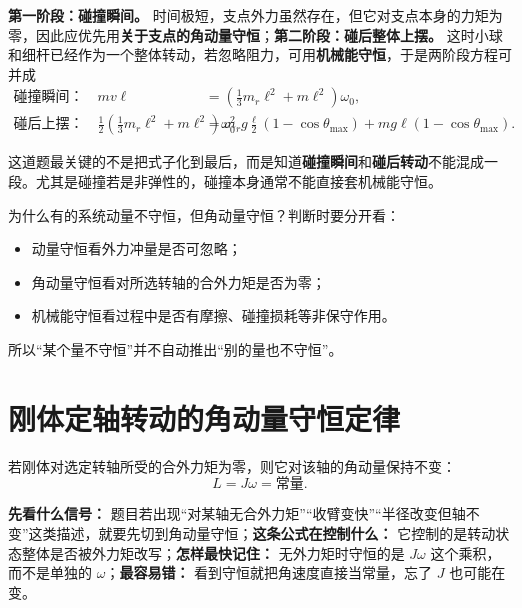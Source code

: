 \documentclass[lang=cn,11pt]{elegantbook}
\begin{document}
\begin{solution}
\textbf{第一阶段：碰撞瞬间。} 时间极短，支点外力虽然存在，但它对支点本身的力矩为零，因此应优先用\textbf{关于支点的角动量守恒}；\textbf{第二阶段：碰后整体上摆。} 这时小球和细杆已经作为一个整体转动，若忽略阻力，可用\textbf{机械能守恒}，于是两阶段方程可并成
\[
\begin{aligned}
\text{碰撞瞬间：}\quad
mv\ell&=\left(\frac13 m_r\ell^2+m\ell^2\right)\omega_0,\\
\text{碰后上摆：}\quad
\frac12 \left(\frac13 m_r\ell^2+m\ell^2\right)\omega_0^2
&=m_rg\frac{\ell}{2}(1-\cos\theta_{\max})+mg\ell(1-\cos\theta_{\max}).
\end{aligned}
\]

这道题最关键的不是把式子化到最后，而是知道\textbf{碰撞瞬间}和\textbf{碰后转动}不能混成一段。尤其是碰撞若是非弹性的，碰撞本身通常不能直接套机械能守恒。
\end{solution}

\begin{remark}
为什么有的系统动量不守恒，但角动量守恒？判断时要分开看：
\begin{itemize}
  \item 动量守恒看外力冲量是否可忽略；
  \item 角动量守恒看对所选转轴的合外力矩是否为零；
  \item 机械能守恒看过程中是否有摩擦、碰撞损耗等非保守作用。
\end{itemize}
所以“某个量不守恒”并不自动推出“别的量也不守恒”。
\end{remark}

\section{刚体定轴转动的角动量守恒定律}

\begin{theorem}[刚体定轴转动的角动量守恒定律]\label{thm:rigid-body-angular-momentum-conservation}
若刚体对选定转轴所受的合外力矩为零，则它对该轴的角动量保持不变：
\[
L=J\omega=\text{常量}.
\]
\end{theorem}

\begin{note}
\textbf{先看什么信号：} 题目若出现“对某轴无合外力矩”“收臂变快”“半径改变但轴不变”这类描述，就要先切到角动量守恒；\textbf{这条公式在控制什么：} 它控制的是转动状态整体是否被外力矩改写；\textbf{怎样最快记住：} 无外力矩时守恒的是 \(J\omega\) 这个乘积，而不是单独的 \(\omega\)；\textbf{最容易错：} 看到守恒就把角速度直接当常量，忘了 \(J\) 也可能在变。
\end{note}
\end{document}
